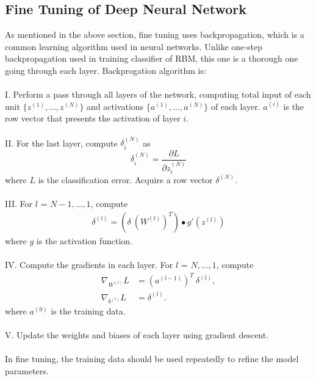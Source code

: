 \documentclass[12pt]{article}
\begin{document}
\subsection{Fine Tuning of Deep Neural Network}
As mentioned in the above section, fine tuning uses backpropagation, which is a common learning algorithm used in neural networks. Unlike one-step backpropagation used in training classifier of RBM, this one is a thorough one going through each layer. Backprogation algorithm is:\\
\\
I. Perform a pass through all layers of the network, computing total input of each unit $\{z^{(1)},..., z^{(N)}\}$ and activations $\{a^{(1)},..., a^{(N)}\}$ of each layer. $a^{(i)}$ is the row vector that presents the activation of layer $i$. \\
\\
II. For the last layer, compute $\delta_i^{(N)}$ as
\begin{equation}
\delta_i^{(N)} = \frac{\partial L}{\partial z^{(N)}_i}
\end{equation}
where $L$ is the classification error. Acquire a row vector $\delta^{(N)}$. \\
\\
III. For $l$ = $N-1, ...,1$, compute 
\begin{align}
\delta^{(l)} = \left(\delta ~ (W^{(l)})^T \right) \bullet g'(z^{(l)})
\end{align}
where $g$ is the activation function.\\
\\
IV. Compute the gradients in each layer. For $l$ = $N, ..., 1$, compute 
\begin{align}
\nabla_{W^{(l)}} L &= (a^{(l-1)})^T~\delta^{(l)}, \\
\nabla_{b^{(l)}} L &= \delta^{(l)}.
\end{align}
where $a^{(0)}$ is the training data.\\
\\
V. Update the weights and biases of each layer using gradient descent.\\
\\
In fine tuning, the training data should be used repeatedly to refine the model parameters.
\end{document}
